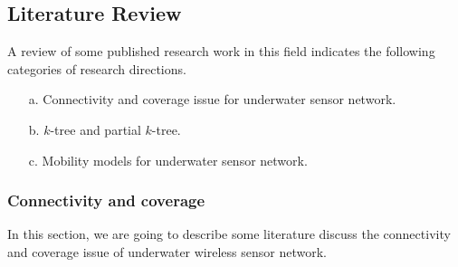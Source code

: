 \documentclass[12pt]{article}
\begin{document}
\subsection{Literature Review}
 A review of some published research work in this field indicates the following categories of research directions.
 \begin{itemize}
 \item[a.] Connectivity and coverage issue for underwater sensor network.
 \item[b.] $k$-tree and partial $k$-tree.
 \item[c.] Mobility models for underwater sensor network.
 \end{itemize}
 \subsubsection{Connectivity and coverage }
 In this section, we are going to describe some literature discuss the connectivity and coverage issue of underwater wireless sensor network.
\end{document}
